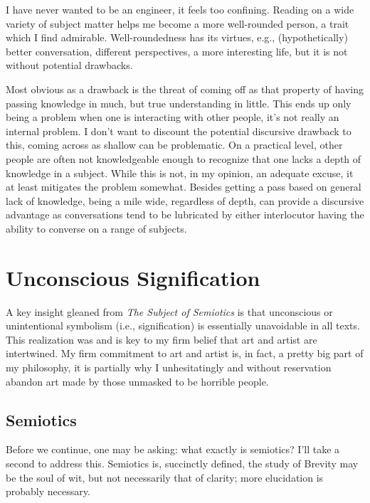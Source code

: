 \documentclass[../butidigress.tex]{subfiles}
\begin{document}
I have never wanted to be  an engineer, it feels too confining.
Reading on a wide variety of subject matter helps me become a more well-rounded person, a trait which I find admirable.
Well-roundedness has its virtues, e.g., (hypothetically) better conversation, different perspectives, a more interesting life, but it is not without potential drawbacks.

Most obvious as a drawback is the threat of coming off as  that property of having passing knowledge in much, but true understanding in little.
This ends up only being a problem when one is interacting with other people, it's not really an internal problem.
I don't want to discount the potential discursive drawback to this, coming across as shallow can be problematic.
On a practical level, other people are often not knowledgeable enough to recognize that one lacks a depth of knowledge in a subject.
While this is not, in my opinion, an adequate excuse, it at least mitigates the problem somewhat.
Besides getting a pass based on general lack of knowledge, being a mile wide, regardless of depth, can provide a discursive advantage as conversations tend to be lubricated by either interlocutor having the ability to converse on a range of subjects.

\section{Unconscious Signification}
A key insight gleaned from \textit{The Subject of Semiotics} is that unconscious or unintentional symbolism (i.e., signification) is essentially unavoidable in all texts.
This realization was and is key to my firm belief that art and artist are intertwined.
My firm commitment to art and artist is, in fact, a pretty big part of my philosophy, it is partially why I unhesitatingly and without reservation abandon art made by those unmasked to be horrible people.

\subsection{Semiotics}
Before we continue, one may be asking: what exactly is semiotics? I'll take a second to address this.
Semiotics is, succinctly defined, the study of 
Brevity may be the soul of wit, but not necessarily that of clarity; more elucidation is probably necessary.
\end{document}
